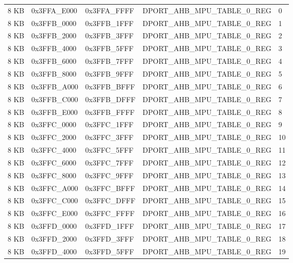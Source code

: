 \begin{longtable}[h]{|p{1.5cm}|p{3cm}|p{3cm}|p{6cm}|p{1.5cm}|}
    \rowcolor{gray!25}
    \multicolumn{5}{|c|}{Internal SRAM 2} \\
    \hline
    8 KB & 0x3FFA\_E000 & 0x3FFA\_FFFF & DPORT\_AHB\_MPU\_TABLE\_0\_REG & 0 \\
    \hline
    8 KB & 0x3FFB\_0000 & 0x3FFB\_1FFF & DPORT\_AHB\_MPU\_TABLE\_0\_REG & 1 \\
    \hline
    8 KB & 0x3FFB\_2000 & 0x3FFB\_3FFF & DPORT\_AHB\_MPU\_TABLE\_0\_REG & 2 \\
    \hline
    8 KB & 0x3FFB\_4000 & 0x3FFB\_5FFF & DPORT\_AHB\_MPU\_TABLE\_0\_REG & 3 \\
    \hline
    8 KB & 0x3FFB\_6000 & 0x3FFB\_7FFF & DPORT\_AHB\_MPU\_TABLE\_0\_REG & 4 \\
    \hline
    8 KB & 0x3FFB\_8000 & 0x3FFB\_9FFF & DPORT\_AHB\_MPU\_TABLE\_0\_REG & 5 \\
    \hline
    8 KB & 0x3FFB\_A000 & 0x3FFB\_BFFF & DPORT\_AHB\_MPU\_TABLE\_0\_REG & 6 \\
    \hline
    8 KB & 0x3FFB\_C000 & 0x3FFB\_DFFF & DPORT\_AHB\_MPU\_TABLE\_0\_REG & 7 \\
    \hline
    8 KB & 0x3FFB\_E000 & 0x3FFB\_FFFF & DPORT\_AHB\_MPU\_TABLE\_0\_REG & 8 \\
    \hline
    8 KB & 0x3FFC\_0000 & 0x3FFC\_1FFF & DPORT\_AHB\_MPU\_TABLE\_0\_REG & 9 \\
    \hline
    8 KB & 0x3FFC\_2000 & 0x3FFC\_3FFF & DPORT\_AHB\_MPU\_TABLE\_0\_REG & 10 \\
    \hline
    8 KB & 0x3FFC\_4000 & 0x3FFC\_5FFF & DPORT\_AHB\_MPU\_TABLE\_0\_REG & 11 \\
    \hline
    8 KB & 0x3FFC\_6000 & 0x3FFC\_7FFF & DPORT\_AHB\_MPU\_TABLE\_0\_REG & 12 \\
    \hline
    8 KB & 0x3FFC\_8000 & 0x3FFC\_9FFF & DPORT\_AHB\_MPU\_TABLE\_0\_REG & 13 \\
    \hline
    8 KB & 0x3FFC\_A000 & 0x3FFC\_BFFF & DPORT\_AHB\_MPU\_TABLE\_0\_REG & 14 \\
    \hline
    8 KB & 0x3FFC\_C000 & 0x3FFC\_DFFF & DPORT\_AHB\_MPU\_TABLE\_0\_REG & 15 \\
    \hline
    8 KB & 0x3FFC\_E000 & 0x3FFC\_FFFF & DPORT\_AHB\_MPU\_TABLE\_0\_REG & 16 \\
    \hline
    8 KB & 0x3FFD\_0000 & 0x3FFD\_1FFF & DPORT\_AHB\_MPU\_TABLE\_0\_REG & 17 \\
    \hline
    8 KB & 0x3FFD\_2000 & 0x3FFD\_3FFF & DPORT\_AHB\_MPU\_TABLE\_0\_REG & 18 \\
    \hline
    8 KB & 0x3FFD\_4000 & 0x3FFD\_5FFF & DPORT\_AHB\_MPU\_TABLE\_0\_REG & 19 \\

\end{longtable}
